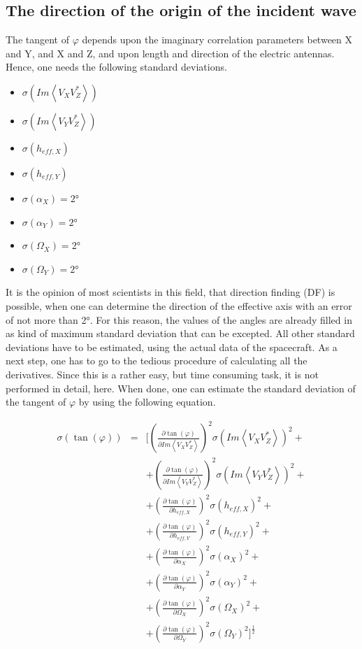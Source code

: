 \documentclass[a4paper,14pt]{extbook}
\begin{document}
\subsection{The direction of the origin of the incident wave}
The tangent of $\varphi$ depends upon the imaginary correlation parameters between X and Y, and X and Z, and upon length and direction of the electric antennas. Hence, one needs the following standard deviations.
\newpage
\begin{itemize}
\item $\sigma (Im \left\langle V_X V_Z^{*}\right\rangle)$
\item $\sigma (Im \left\langle V_Y V_Z^{*}\right\rangle)$
\item $\sigma (h_{eff,X})$
\item $\sigma (h_{eff,Y})$
\item $\sigma (\alpha_X)=2°$
\item $\sigma (\alpha_Y)=2°$
\item $\sigma (\Omega_X)=2°$
\item $\sigma (\Omega_Y)=2°$
\end{itemize}

It is the opinion of most scientists in this field, that direction finding (DF) is possible, when one can determine the direction of the effective axis with an error of not more than 2°. For this reason, the values of the angles are already filled in  as kind of maximum standard deviation that can be excepted. All other standard deviations have to be estimated, using the actual data of the spacecraft. As a next step, one has to go to the tedious procedure of calculating all the derivatives. Since this is a rather easy, but time consuming task, it is not performed in detail, here. When done, one can estimate the standard deviation of the tangent of $\varphi$ by using the following equation.

\begin{eqnarray}
\sigma (\tan (\varphi)) &=&  [(\frac{\partial \tan (\varphi)}{\partial Im \left\langle V_X V_Z^{*}\right\rangle})^2 \sigma (Im \left\langle V_X V_Z^{*}\right\rangle)^2+\\
&&+ (\frac{\partial \tan (\varphi)}{\partial Im \left\langle V_Y V_Z^{*}\right\rangle})^2 \sigma (Im \left\langle V_Y V_Z^{*}\right\rangle)^2 +\nonumber \\
&&+ (\frac{\partial \tan (\varphi)}{\partial h_{eff,X}})^2 \sigma (h_{eff,X})^2+ \nonumber \\
&&+ (\frac{\partial \tan (\varphi)}{\partial h_{eff,Y}})^2 \sigma (h_{eff,Y})^2+ \nonumber \\
&&+ (\frac{\partial \tan (\varphi)}{\partial \alpha_X})^2 \sigma (\alpha_X)^2+ \nonumber \\
&&+ (\frac{\partial \tan (\varphi)}{\partial \alpha_Y})^2 \sigma (\alpha_Y)^2+ \nonumber \\
&& +(\frac{\partial \tan (\varphi)}{\partial \Omega_X})^2 \sigma (\Omega_X)^2+ \nonumber \\
&&+ (\frac{\partial \tan (\varphi)}{\partial \Omega_Y})^2 \sigma (\Omega_Y)^2]^\frac{1}{2} \nonumber
\end{eqnarray}
\end{document}
